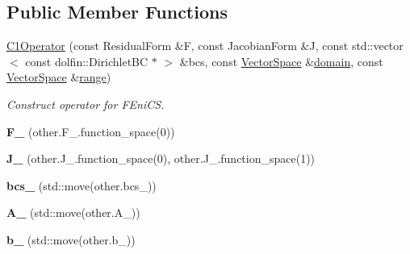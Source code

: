 \subsection*{\-Public \-Member \-Functions}
\begin{DoxyCompactItemize}
\item 
\hyperlink{classSpacy_1_1FEniCS_1_1C1Operator_a3e578031e731cad3f4fa8b7364f8ec97}{\-C1\-Operator} (const \-Residual\-Form \&\-F, const \-Jacobian\-Form \&\-J, const std\-::vector$<$ const dolfin\-::\-Dirichlet\-B\-C $\ast$ $>$ \&bcs, const \hyperlink{classSpacy_1_1VectorSpace}{\-Vector\-Space} \&\hyperlink{classSpacy_1_1OperatorBase_a2588f9b3e0188820c4c494e63293dc6f}{domain}, const \hyperlink{classSpacy_1_1VectorSpace}{\-Vector\-Space} \&\hyperlink{classSpacy_1_1OperatorBase_ab19d3b7a6f290b1079248f1e567e53d6}{range})
\begin{DoxyCompactList}\small\item\em \-Construct operator for \-F\-Eni\-C\-S. \end{DoxyCompactList}\item 
\hypertarget{classSpacy_1_1FEniCS_1_1C1Operator_af56cc1d94912742db3dc1f811cf1c99b}{{\bfseries \-F\-\_\-} (other.\-F\-\_\-.\-function\-\_\-space(0))}\label{classSpacy_1_1FEniCS_1_1C1Operator_af56cc1d94912742db3dc1f811cf1c99b}

\item 
\hypertarget{classSpacy_1_1FEniCS_1_1C1Operator_a8907d5a84e6d5558de5e63c215e1b5d6}{{\bfseries \-J\-\_\-} (other.\-J\-\_\-.\-function\-\_\-space(0), other.\-J\-\_\-.\-function\-\_\-space(1))}\label{classSpacy_1_1FEniCS_1_1C1Operator_a8907d5a84e6d5558de5e63c215e1b5d6}

\item 
\hypertarget{classSpacy_1_1FEniCS_1_1C1Operator_a601e8c31ed240c16b6318702461caa92}{{\bfseries bcs\-\_\-} (std\-::move(other.\-bcs\-\_\-))}\label{classSpacy_1_1FEniCS_1_1C1Operator_a601e8c31ed240c16b6318702461caa92}

\item 
\hypertarget{classSpacy_1_1FEniCS_1_1C1Operator_acb2df6d413ebce7c46fd5f51647760dc}{{\bfseries \-A\-\_\-} (std\-::move(other.\-A\-\_\-))}\label{classSpacy_1_1FEniCS_1_1C1Operator_acb2df6d413ebce7c46fd5f51647760dc}

\item 
\hypertarget{classSpacy_1_1FEniCS_1_1C1Operator_a90c353a5a884d890aea6066b9d77f716}{{\bfseries b\-\_\-} (std\-::move(other.\-b\-\_\-))}\label{classSpacy_1_1FEniCS_1_1C1Operator_a90c353a5a884d890aea6066b9d77f716}


\end{DoxyCompactItemize}
